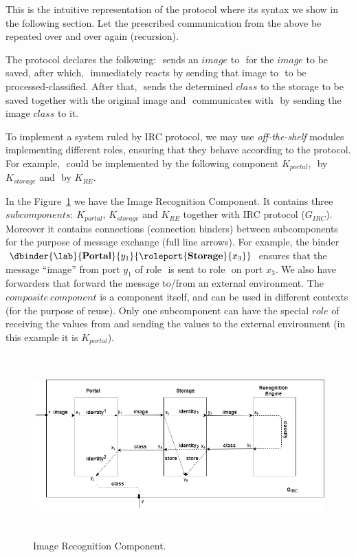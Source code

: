This is the intuitive representation of the protocol where its syntax we show in the following section. Let the prescribed communication from the above be repeated over and over again (recursion).

The protocol declares the following: \portal $ $ sends an $image$ to \storage $ $ for the $image$ to be saved, after which, \storage $ $ immediately reacts by sending that image to \re $ $ to be processed-classified. After that, \re $ $ sends the determined $class$ to the storage to be saved together with the original image and \storage $ $ communicates with \portal $ $ by sending the image $class$ to it. 

To implement a system ruled by IRC protocol, we may use \textit{off-the-shelf} modules implementing different roles, ensuring that they behave according to the protocol. For example, \portal $ $ could
be implemented by the following component $K_{portal}$, \storage $ $ by $K_{storage}$ and \re $ $ by $K_{RE}$.







In the Figure~\ref{irc1} we have the Image Recognition Component. It contains three $subcomponents$: $K_{portal}$, $K_{storage}$ and $K_{RE}$ together with IRC protocol ($G_{IRC}$). Moreover it contains connections (connection binders) between subcomponents for the purpose of message exchange (full line arrows). For example, the binder $\dbinder{\lab}{\mathbf{Portal}}{y_1}{\roleport{\mathbf{Storage}}{x_3}}$ ensures that the message ``image'' from port $y_1$ of role \portal $ $ is sent to  role \storage $ $ on port $x_3$. We also have forwarders that forward the message to/from an external environment. The $composite\ component$ is a component itself, and can be used in different contexts (for the purpose of reuse).
Only one subcomponent can have the special $role$ of receiving the values from and sending the values to the external environment (in this example it is $K_{portal}$). 


\begin{figure}[H]

\includegraphics[width=\textwidth, height=7cm]{graph1.jpg}
\centering
\caption{Image Recognition Component.
\label{irc1}}

\end{figure}


